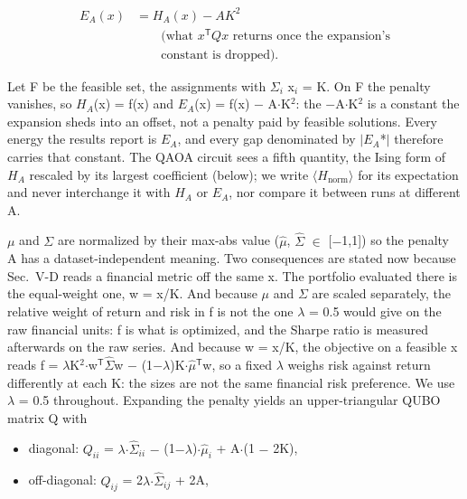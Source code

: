\documentclass[journal]{IEEEtran}
\begin{document}
\begin{equation*}
\begin{aligned} E_A(x) &= H_A(x) - A K^2 \\ &\qquad\text{(what $x^{\mathsf{T}}Qx$ returns once the expansion's}\\ &\qquad\text{constant is dropped).}\end{aligned}
\end{equation*}


Let F be the feasible set, the assignments with $\Sigma$$_i$ x$_i$ = K. On F the penalty vanishes, so $H_{A}$(x) = f(x) and $E_{A}$(x) = f(x) $-$ A$\cdot$K$^{2}$: the $-$A$\cdot$K$^{2}$ is a constant the expansion sheds into an offset, not a penalty paid by feasible solutions. Every energy the results report is $E_{A}$, and every gap denominated by $|$$E_{A}$*$|$ therefore carries that constant. The QAOA circuit sees a fifth quantity, the Ising form of $H_{A}$ rescaled by its largest coefficient (below); we write $\langle$$H_{\mathrm{norm}}$$\rangle$ for its expectation and never interchange it with $H_{A}$ or $E_{A}$, nor compare it between runs at different A.


$\mu$ and $\Sigma$ are normalized by their max-abs value ($\hat{\mu}$, $\hat{\Sigma}$ $\in$ [$-$1,1]) so the penalty A has a dataset-independent meaning. Two consequences are stated now because Sec.~V-D reads a financial metric off the same x. The portfolio evaluated there is the equal-weight one, w = x/K. And because $\mu$ and $\Sigma$ are scaled separately, the relative weight of return and risk in f is not the one $\lambda$ = 0.5 would give on the raw financial units: f is what is optimized, and the Sharpe ratio is measured afterwards on the raw series. And because w = x/K, the objective on a feasible x reads f = $\lambda$K$^{2}$$\cdot$w$^{\mathsf{T}}$$\hat{\Sigma}$w $-$ (1$-$$\lambda$)K$\cdot$$\hat{\mu}$$^{\mathsf{T}}$w, so a fixed $\lambda$ weighs risk against return differently at each K: the sizes are not the same financial risk preference. We use $\lambda$ = 0.5 throughout. Expanding the penalty yields an upper-triangular QUBO matrix Q with


\begin{itemize}
\item diagonal: $Q_{ii}$ = $\lambda$$\cdot$$\hat{\Sigma}_{ii}$ $-$ (1$-$$\lambda$)$\cdot$$\hat{\mu}_{i}$ + A$\cdot$(1 $-$ 2K),
\item off-diagonal: $Q_{ij}$ = 2$\lambda$$\cdot$$\hat{\Sigma}_{ij}$ + 2A,
\end{itemize}
\end{document}
